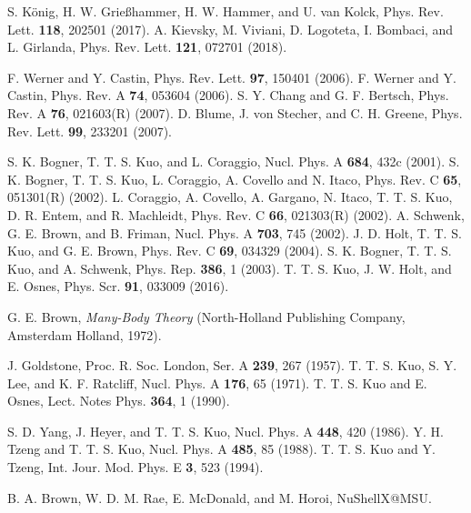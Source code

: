 \documentclass[twocolumn,preprintnumbers,superscriptaddress]{revtex4}
\begin{document}
\begin{thebibliography}{50}
 S. K\"{o}nig, H. W. Grie{\ss}hammer, H. W. Hammer, and U. van Kolck, Phys. Rev. Lett. {\bf 118}, 202501 (2017).
 A. Kievsky, M. Viviani, D. Logoteta, I. Bombaci, and L. Girlanda, Phys. Rev. Lett. {\bf 121}, 072701 (2018).


 F. Werner and Y. Castin, Phys. Rev. Lett. {\bf 97}, 150401 (2006).
 F. Werner and Y. Castin, Phys. Rev. A {\bf 74}, 053604 (2006).
 S. Y. Chang and G. F. Bertsch, Phys. Rev. A {\bf 76}, 021603(R) (2007).
 D. Blume, J. von Stecher, and C. H. Greene, Phys. Rev. Lett. {\bf 99}, 233201 (2007).

 S. K. Bogner, T. T. S. Kuo, and L. Coraggio, Nucl. Phys. A {\bf 684}, 432c (2001).
 S. K. Bogner, T. T. S. Kuo, L. Coraggio, A. Covello and N. Itaco, Phys. Rev. C {\bf 65}, 051301(R) (2002).
 L. Coraggio, A. Covello, A. Gargano, N. Itaco, T. T. S. Kuo, D. R. Entem, and R. Machleidt, Phys. Rev. C {\bf 66}, 021303(R) (2002).
 A. Schwenk, G. E. Brown, and B. Friman, Nucl. Phys. A {\bf 703}, 745 (2002).
 J. D. Holt, T. T. S. Kuo, and G. E. Brown, Phys. Rev. C {\bf 69}, 034329 (2004).
 S. K. Bogner, T. T. S. Kuo, and A. Schwenk, Phys. Rep. {\bf 386}, 1 (2003).
 T. T. S. Kuo, J. W. Holt, and E. Osnes, Phys. Scr. {\bf 91}, 033009 (2016).

 G. E. Brown, {\it Many-Body Theory} (North-Holland Publishing Company, Amsterdam Holland, 1972).

 J. Goldstone, Proc. R. Soc. London, Ser. A {\bf 239}, 267 (1957).
 T. T. S. Kuo, S. Y. Lee, and K. F. Ratcliff, Nucl. Phys. A {\bf 176}, 65 (1971).
 T. T. S. Kuo and E. Osnes, Lect. Notes Phys. {\bf 364}, 1 (1990).

 S. D. Yang, J. Heyer, and T. T. S. Kuo, Nucl. Phys. A {\bf 448}, 420 (1986).
 Y. H. Tzeng and T. T. S. Kuo, Nucl. Phys. A {\bf 485}, 85 (1988).
 T. T. S. Kuo and Y. Tzeng, Int. Jour. Mod. Phys. E {\bf 3}, 523 (1994).

 B. A. Brown, W. D. M. Rae, E. McDonald, and M. Horoi, NuShellX@MSU.

\end{thebibliography}
\end{document}
